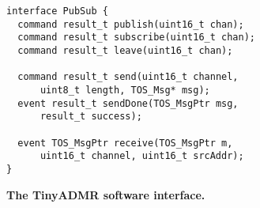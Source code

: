 \begin{figure}[t]
\begin{small}
\begin{verbatim}
interface PubSub {
  command result_t publish(uint16_t chan);
  command result_t subscribe(uint16_t chan);
  command result_t leave(uint16_t chan);

  command result_t send(uint16_t channel, 
      uint8_t length, TOS_Msg* msg);
  event result_t sendDone(TOS_MsgPtr msg, 
      result_t success);

  event TOS_MsgPtr receive(TOS_MsgPtr m, 
      uint16_t channel, uint16_t srcAddr);
}
\end{verbatim}
\end{small}
\caption{{\small\bf The TinyADMR software interface.}}
\label{fig-interface}
\end{figure}

% 
% 

